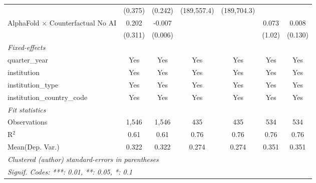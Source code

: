 \begin{tabular}{lcccccc}
                                            & (0.375) & (0.242)       & (189,557.4) & (189,704.3) &         &   \\   
   AlphaFold $\times$ Counterfactual No AI  & 0.202   & -0.007        &             &             & 0.073   & 0.008\\   
                                            & (0.311) & (0.006)       &             &             & (1.02)  & (0.130)\\   
   \midrule
   \emph{Fixed-effects}\\
   quarter\_year                            & Yes     & Yes           & Yes         & Yes         & Yes     & Yes\\  
   institution                              & Yes     & Yes           & Yes         & Yes         & Yes     & Yes\\  
   institution\_type                        & Yes     & Yes           & Yes         & Yes         & Yes     & Yes\\  
   institution\_country\_code               & Yes     & Yes           & Yes         & Yes         & Yes     & Yes\\  
   \midrule
   \emph{Fit statistics}\\
   Observations                             & 1,546   & 1,546         & 435         & 435         & 534     & 534\\  
   R$^2$                                    & 0.61    & 0.61          & 0.76        & 0.76        & 0.76    & 0.76\\  
Mean(Dep. Var.) & 0.322 & 0.322 & 0.274 & 0.274 & 0.351 & 0.351 \\
   \midrule \midrule
   \multicolumn{7}{l}{\emph{Clustered (author) standard-errors in parentheses}}\\
   \multicolumn{7}{l}{\emph{Signif. Codes: ***: 0.01, **: 0.05, *: 0.1}}\\
\end{tabular}
\par\endgroup
